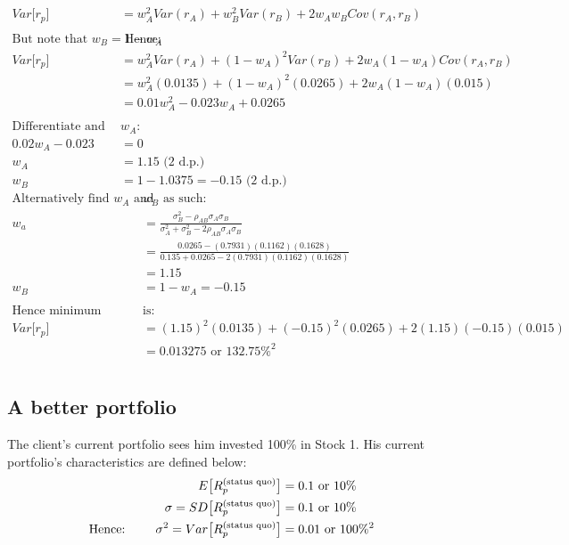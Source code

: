 \documentclass[12pt]{article}
\begin{document}
\subsection{}
\begin{align*}
	Var\big[r_p\big] &= w_A^2Var(r_A) + w_B^2Var(r_B) + 2w_Aw_B\textit{Cov}(r_A,r_B)\\
	&\\
	\text{But note that } w_B = 1-w_A& \text{ Hence:}\\
	Var\big[r_p\big] &= w_A^2Var(r_A) + (1-w_A)^2Var(r_B) + 2w_A(1-w_A)\textit{Cov}(r_A,r_B)\\
	&= w_A^2(0.0135) + (1-w_A)^2(0.0265) + 2w_A(1-w_A)(0.015)\\
	&= 0.01w_A^2 - 0.023w_A + 0.0265\\
	&\\
	\text{Differentiate and solve for }&\text{$w_A$:}\\
	0.02w_A - 0.023 &= 0\\
	w_A &= 1.15 \text{  (2 d.p.)}\\
	w_B &= 1-1.0375 = -0.15 \text{  (2 d.p.)}
\end{align*}
\begin{align*}
	\text{Alternatively find $w_A$ and }&\text{$w_B$ as such:}\\
	w_a &= \frac{\sigma_B^2-\rho_{AB}\sigma_A\sigma_B}{\sigma_A^2+\sigma_B^2-2\rho_{AB}\sigma_A\sigma_B}\\
	&= \frac{0.0265-(0.7931)(0.1162)(0.1628)}{0.135+0.0265-2(0.7931)(0.1162)(0.1628)}\\
	&= 1.15\\
	w_B &= 1 - w_A = -0.15\\
	&\\
	\text{Hence minimum variance }&\text{is:}\\
	Var\big[r_p\big] &= (1.15)^2(0.0135) + (-0.15)^2(0.0265) + 2(1.15)(-0.15)(0.015)\\
	&= 0.013275 \text{ or } 132.75\%^2
\end{align*}

\section{}
\subsection{A better portfolio}
The client's current portfolio sees him invested 100\% in Stock 1. His current portfolio's characteristics are defined below:
\begin{align*}
	E\big[R_p^{\text{(status quo)}}\big] &= 0.1 \text{ or } 10\%\\
	\sigma = SD\big[R_p^{\text{(status quo)}}\big] &= 0.1 \text{ or } 10\%\\
	\text{Hence: \qquad}\sigma^2 = Var\big[R_p^{\text{(status quo)}}\big] &= 0.01 \text{ or } 100\%^2\\
\end{align*}
\end{document}
